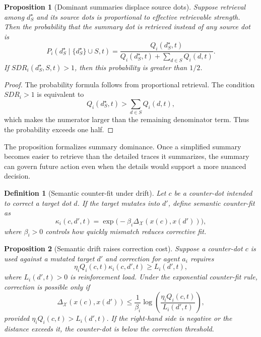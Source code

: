 \documentclass[11pt]{article}
\newtheorem{definition}{Definition}
\newtheorem{proposition}{Proposition}
\theoremstyle{remark}
\begin{document}
\begin{proposition}[Dominant summaries displace source dots]\label{prop:dominant-summaries-displace-source-dots}
Suppose retrieval among $d_S^\star$ and its source dots is proportional
to effective retrievable strength. Then the probability that the summary
dot is retrieved instead of any source dot is
$$
P_i(d_S^\star\mid \{d_S^\star\}\cup S,t)=
\frac{Q_i(d_S^\star,t)}{Q_i(d_S^\star,t)+\sum_{d\in S}Q_i(d,t)}.
$$
If $SDR_i(d_S^\star,S,t)>1$, then this probability is greater than
$1/2$.
\end{proposition}

\begin{proof}
The probability formula follows from proportional retrieval. The
condition $SDR_i>1$ is equivalent to
$$
Q_i(d_S^\star,t)>\sum_{d\in S}Q_i(d,t),
$$
which makes the numerator larger than the remaining denominator term.
Thus the probability exceeds one half.
\end{proof}

The proposition formalizes summary dominance. Once a simplified summary
becomes easier to retrieve than the detailed traces it summarizes, the
summary can govern future action even when the details would support a
more nuanced decision.

\begin{definition}[Semantic counter-fit under drift]\label{def:semantic-counter-fit-under-drift}
Let $c$ be a counter-dot intended to correct a target dot $d$. If the
target mutates into $d'$, define semantic counter-fit as
$$
\kappa_i(c,d',t)=\exp\big(-\beta_i\Delta_{\mathcal X}(x(c),x(d'))\big),
$$
where $\beta_i>0$ controls how quickly mismatch reduces corrective fit.
\end{definition}

\begin{proposition}[Semantic drift raises correction cost]\label{prop:semantic-drift-raises-correction-cost}
Suppose a counter-dot $c$ is used against a mutated target $d'$ and
correction for agent $a_i$ requires
$$
\eta_i Q_i(c,t)\kappa_i(c,d',t)\geq L_i(d',t),
$$
where $L_i(d',t)>0$ is reinforcement load. Under the exponential
counter-fit rule, correction is possible only if
$$
\Delta_{\mathcal X}(x(c),x(d'))\leq
\frac{1}{\beta_i}
\log\left(\frac{\eta_i Q_i(c,t)}{L_i(d',t)}\right),
$$
provided $\eta_i Q_i(c,t)>L_i(d',t)$. If the right-hand side is negative
or the distance exceeds it, the counter-dot is below the correction
threshold.
\end{proposition}
\end{document}

